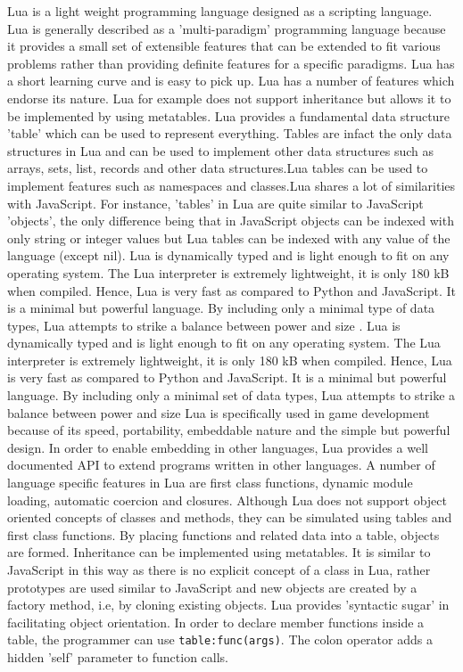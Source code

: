 Lua is a light weight programming language designed as a scripting language. Lua is generally described as a 'multi-paradigm' programming language because it provides a small set of extensible features that can be extended to fit various problems rather than providing definite features for a specific paradigms. Lua has a short learning curve and is easy to pick up. Lua has a number of features which endorse its  nature. Lua for example does not support inheritance but allows it to be implemented by using metatables.
Lua provides a fundamental data structure 'table' which can be used to represent everything. Tables are infact the only data structures in Lua and can be used to implement other data structures such as arrays, sets, list, records and other data structures.Lua tables can be used to implement features such as namespaces and classes.Lua shares a lot of similarities with JavaScript. For instance, 'tables' in Lua are quite similar to JavaScript 'objects', the only difference being that in JavaScript objects can be indexed with only string or integer values but Lua tables can be indexed with any value of the language (except nil). 
Lua is dynamically typed and is light enough to fit on any operating system. The Lua interpreter is extremely lightweight, it is only 180 kB when compiled. Hence, Lua is very fast as compared to Python and JavaScript. It is a minimal but powerful language. By including only a minimal type of data types, Lua attempts to strike a balance between power and size \cite{about_lua}.
Lua is dynamically typed and is light enough to fit on any operating system. The Lua interpreter is extremely lightweight, it is only 180 kB when compiled. Hence, Lua is very fast as compared to Python and JavaScript. It is a minimal but powerful language. By including only a minimal set of data types, Lua attempts to strike a balance between power and size \cite{about_lua}
Lua is specifically used in game development because of its speed, portability, embeddable nature and the simple but powerful design. In order to enable embedding in other languages, Lua provides a well documented API to extend programs written in other languages. 
A number of language specific features in Lua are first class functions, dynamic module loading, automatic coercion and closures. Although Lua does not support object oriented concepts of classes and methods, they can be simulated using tables and first class functions. By placing functions and related data into a table, objects are formed. Inheritance can be implemented  using metatables. It is similar to JavaScript in this way as there is no explicit concept of a class in Lua, rather prototypes are used similar to JavaScript and new objects are created by a factory method, i.e, by cloning existing objects. Lua provides 'syntactic sugar' in facilitating object orientation. In order to declare member functions inside a table, the programmer can use \texttt{table:func(args)}. The colon operator adds a hidden 'self' parameter to function calls.
